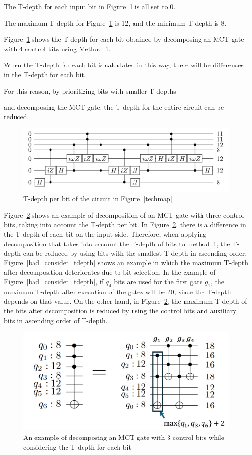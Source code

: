 The T-depth for each input bit in Figure~\ref{bit_tdepth} is all set to 0.

The maximum T-depth for Figure~\ref{bit_tdepth} is 12,
and the minimum T-depth is 8.

Figure~\ref{bit_tdepth} shows the T-depth for each bit obtained by decomposing an MCT gate with 4 control bits using Method~1.

When the T-depth for each bit is calculated in this way, there will be differences in the T-depth for each bit.

For this reason, by prioritizing bits with smaller T-depths

and decomposing the MCT gate, the T-depth for the entire circuit can be reduced.
\begin{figure}
\centering
\includegraphics[width=0.95\linewidth]{img/bit_tdepth.pdf}
\caption{T-depth per bit of the circuit in Figure~\ref{techmap}}
\label{bit_tdepth}
\end{figure}
\par
Figure~\ref{consider_tdepth} shows an example of decomposition of an MCT gate with three control bits, taking into account the T-depth per bit.
In Figure~\ref{consider_tdepth}, there is a difference in the T-depth of each bit on the input side.
Therefore, when applying decomposition that takes into account the T-depth of bits to method~1,
the T-depth can be reduced by using bits with the smallest T-depth in ascending order.
Figure~\ref{bad_consider_tdepth} shows an example in which the maximum T-depth after decomposition deteriorates due to bit selection.
In the example of Figure~\ref{bad_consider_tdepth},
if $q_{4}$ bits are used for the first gate $g_{1}$,
the maximum T-depth after execution of the  gates will be 20, since the T-depth depends on that value.
On the other hand, in Figure~\ref{consider_tdepth},
the maximum T-depth of the bits after decomposition is reduced by using the control bits and auxiliary bits in ascending order of T-depth.
\begin{figure}[tbp]
\centering
\includegraphics[width=0.95\linewidth]{img/considering_bit_tdepth.pdf}
\caption{An example of decomposing an MCT gate with 3 control bits while considering the T-depth for each bit}
\label{consider_tdepth}
\end{figure}
